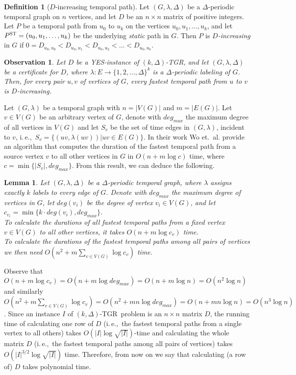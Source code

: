 \documentclass[11pt,a4paper]{article}
\newtheorem{observation}{Observation}
\newtheorem{lemma}[theorem]{Lemma}
\theoremstyle{remark}
\theoremstyle{definition}
\newtheorem{definition}[theorem]{Definition}
\newcommand{\ie}{i.\,e.,\ }
\newcommand{\kDeltaExact}{\textsc{$(k,\Delta)$-TGR}}
\begin{document}
\begin{definition}[$D$-increasing temporal path]
Let $(G,\lambda,\Delta)$ be a $\Delta$-periodic temporal graph on $n$ vertices, and let $D$ be an $n\times n $ matrix of positive integers. 
Let $P$ be a temporal path from $u_0$ to $u_k$ on the vertices $u_0,u_1,\ldots,u_k$, and let $P^\textsc{ST}=(u_0,u_1,\ldots,u_k)$ be the underlying \emph{static} path in $G$.
Then $P$ is \emph{$D$-increasing} in $G$ if $0=D_{u_0,u_0}<D_{u_0,u_1}<D_{u_0,u_2}< \ldots < D_{u_0,u_k}$.
\end{definition}


\begin{observation}
Let $D$ be a \textsc{YES}-instance of \textsc{$(k,\Delta)$-TGR}, and let 
$(G,\lambda,\Delta)$ be a certificate for $D$, where $\lambda:E\rightarrow \{1,2,\ldots,\Delta\}^k$ is a $\Delta$-periodic labeling of $G$.
Then, for every pair $u,v$ of vertices of $G$, every fastest temporal path from $u$ to $v$ is $D$-increasing.
\end{observation}

Let $(G,\lambda)$ be a temporal graph with  $n = |V(G)|$ and  $m=|E(G)|$.
Let $v \in V(G)$ be an arbitrary vertex of $G$, denote with $deg_{max}$ the maximum degree of all vertices in $V(G)$ and let $S_v$ be the set of time edges in $(G,\lambda)$, incident to $v$, \ie $S_v = \{(uv, \lambda(uv)) | uv \in E(G)\}$.
In their work Wo et.~al. \cite{Wu2016Efficient} provide an algorithm that computes the duration of the fastest temporal path from a source vertex $v$ to all other vertices in $G$ in
$O(n + m \log c)$ time, where $c = \min \{|S_v|, deg_{max}\}$.
From this result, we can deduce the following. 
\begin{lemma} \label{lemma:calculatingD}
Let $(G, \lambda, \Delta)$ be a $\Delta$-periodic temporal graph, where $\lambda$ assigns exactly $k$ labels to every edge of $G$. 
Denote with $deg_{max}$ the maximum degree of vertices in $G$, let $deg(v_i)$ be the degree of vertex $v_i \in V(G)$,
and let $c_{v_i} = \min \{ k \cdot deg(v_i), deg_{max}\}$.\\
To calculate the durations of all fastest temporal paths from a fixed vertex $v \in V(G)$ to all other vertices, it takes $O(n + m \log c_v)$ time. \\
To calculate the durations of the fastest temporal paths among all pairs of vertices we then need $O(n^2 + m \sum_{v \in V(G)} \log c_v)$ time.
\end{lemma}

Observe that $O(n + m \log c_v) = O(n + m \log deg_{max}) = O(n + m \log n) = O(n^2 \log n)$ and similarly
$O(n^2 + m \sum_{v \in V(G)} \log c_v) = O(n^2 + mn \log deg_{max}) = O(n + mn \log n) = O(n^3 \log n)$.
Since an instance $I$ of \kDeltaExact\ problem is an $n \times n$ matrix $D$, the running time of calculating one row of $D$ (\ie the fastest temporal paths from a single vertex to all others) takes $O(|I|\log \sqrt{|I|})$-time and calculating the whole matrix $D$ (\ie the fastest temporal paths among all pairs of vertices) takes $O(|I|^{3/2} \log \sqrt{|I|})$ time.
Therefore, from now on we say that calculating (a row of) $D$ takes polynomial time.
\end{document}
